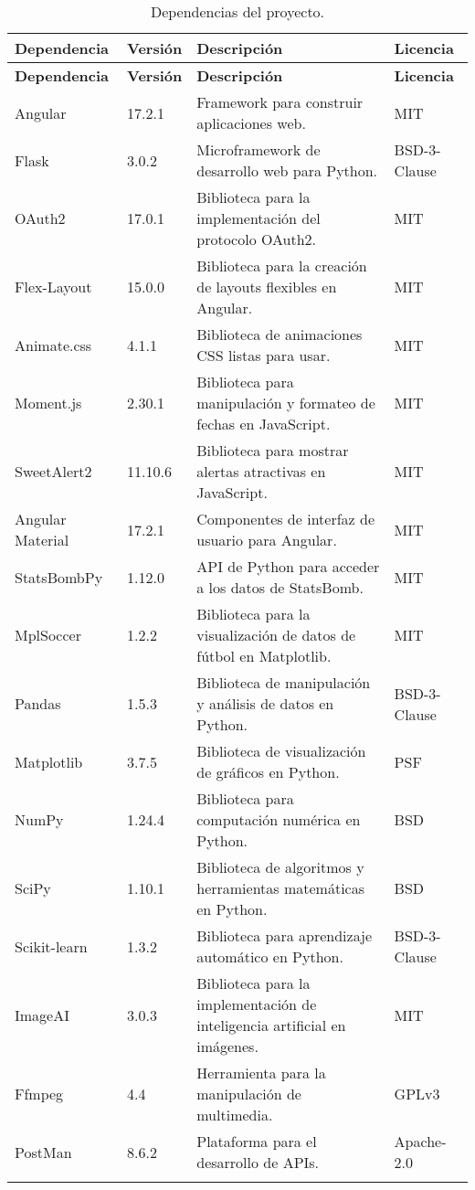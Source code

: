 \begin{longtable}{>{\raggedright}m{4cm} >{\raggedright}m{2cm} >{\raggedright}m{6cm} >{\raggedright\arraybackslash}m{2cm}}
\toprule
\textbf{Dependencia} & \textbf{Versión} & \textbf{Descripción} & \textbf{Licencia} \\
\midrule
\endfirsthead
\toprule
\textbf{Dependencia} & \textbf{Versión} & \textbf{Descripción} & \textbf{Licencia} \\
\midrule
\endhead
Angular & 17.2.1 & Framework para construir aplicaciones web. & MIT \\
Flask & 3.0.2 & Microframework de desarrollo web para Python. & BSD-3-Clause \\
OAuth2 & 17.0.1 & Biblioteca para la implementación del protocolo OAuth2. & MIT \\
Flex-Layout & 15.0.0 & Biblioteca para la creación de layouts flexibles en Angular. & MIT \\
Animate.css & 4.1.1 & Biblioteca de animaciones CSS listas para usar. & MIT \\
Moment.js & 2.30.1 & Biblioteca para manipulación y formateo de fechas en JavaScript. & MIT \\
SweetAlert2 & 11.10.6 & Biblioteca para mostrar alertas atractivas en JavaScript. & MIT \\
Angular Material & 17.2.1 & Componentes de interfaz de usuario para Angular. & MIT \\
StatsBombPy & 1.12.0 & API de Python para acceder a los datos de StatsBomb. & MIT \\
MplSoccer & 1.2.2 & Biblioteca para la visualización de datos de fútbol en Matplotlib. & MIT \\
Pandas & 1.5.3 & Biblioteca de manipulación y análisis de datos en Python. & BSD-3-Clause \\
Matplotlib & 3.7.5 & Biblioteca de visualización de gráficos en Python. & PSF \\
NumPy & 1.24.4 & Biblioteca para computación numérica en Python. & BSD \\
SciPy & 1.10.1 & Biblioteca de algoritmos y herramientas matemáticas en Python. & BSD \\
Scikit-learn & 1.3.2 & Biblioteca para aprendizaje automático en Python. & BSD-3-Clause \\
ImageAI & 3.0.3 & Biblioteca para la implementación de inteligencia artificial en imágenes. & MIT \\
Ffmpeg & 4.4 & Herramienta para la manipulación de multimedia. & GPLv3 \\
PostMan & 8.6.2 & Plataforma para el desarrollo de APIs. & Apache-2.0 \\
\bottomrule
\caption{Dependencias del proyecto.}
\end{longtable}

